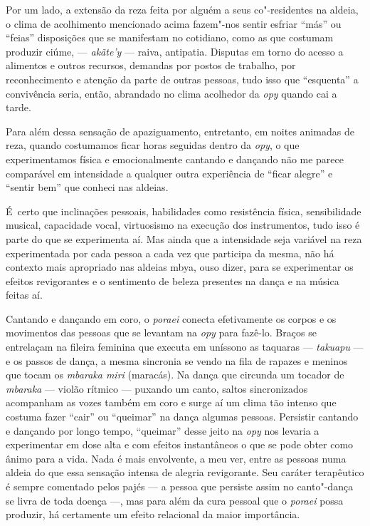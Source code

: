 Por um lado, a extensão da reza feita por alguém a seus co"-residentes na
aldeia, o clima de acolhimento mencionado acima fazem"-nos sentir
esfriar ``más'' ou ``feias'' disposições que se manifestam no cotidiano,
como as que costumam produzir ciúme, --- \emph{akãte’y} --- raiva, antipatia.
Disputas em torno do acesso a alimentos e outros recursos, demandas por
postos de trabalho, por reconhecimento e atenção da parte de outras
pessoas, tudo isso que ``esquenta'' a convivência seria, então, abrandado
no clima acolhedor da \emph{opy} quando cai a tarde.

Para além dessa sensação de apaziguamento, entretanto, em noites
animadas de reza, quando costumamos ficar horas seguidas dentro da \emph{opy},
o que experimentamos física e emocionalmente cantando e dançando não me
parece comparável em intensidade a qualquer outra experiência de ``ficar
alegre'' e ``sentir bem'' que conheci nas aldeias.

É~certo que inclinações pessoais, habilidades como resistência física,
sensibilidade musical, capacidade vocal, virtuosismo na execução dos
instrumentos, tudo isso é parte do que se experimenta aí. Mas ainda que
a intensidade seja variável na reza experimentada por cada pessoa a
cada vez que participa da mesma, não há contexto mais apropriado nas
aldeias mbya, ouso dizer, para se experimentar os efeitos revigorantes
e o sentimento de beleza presentes na dança e na música feitas aí.

Cantando e dançando em coro, o \emph{poraei} conecta efetivamente os corpos e
os movimentos das pessoas que se levantam na \emph{opy} para fazê-lo. Braços
se entrelaçam na fileira feminina que executa em uníssono as taquaras ---
\emph{takuapu} --- e os passos de dança, a mesma sincronia se vendo na fila de
rapazes e meninos que tocam os \emph{mbaraka miri} (maracás). Na dança que
circunda um tocador de \emph{mbaraka} --- violão rítmico --- puxando um canto,
saltos sincronizados acompanham as vozes também em coro e surge aí um
clima tão intenso que costuma fazer ``cair'' ou ``queimar'' na dança
algumas pessoas. Persistir cantando e dançando por longo tempo,
``queimar'' desse jeito na \emph{opy} nos levaria a experimentar em dose alta e
com efeitos instantâneos o que se pode obter como ânimo para a vida.
Nada é mais envolvente, a meu ver, entre as pessoas numa aldeia do que
essa sensação intensa de alegria revigorante. Seu caráter terapêutico é
sempre comentado pelos pajés --- a pessoa que persiste assim no canto"-dança
se livra de toda doença ---, mas para além da cura pessoal que o
\emph{poraei} possa produzir, há certamente um efeito relacional da maior
importância.

